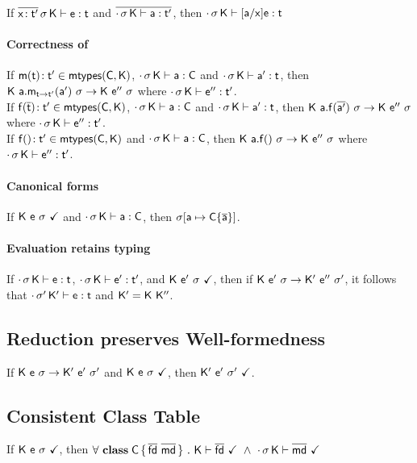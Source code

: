 \documentclass[acmlarge, anonymous, authordraft]{acmart}
\begin{document}
If $\EnvType{\b{\HT\x\tp}}\s\K\e\t$ and $\b{\EnvType\cdot\s\K\a\tp}$, then $\EnvType\cdot\s\K{[\a/\x]\e}\t$

\paragraph{Correctness of \classoff{\C}{\K}}

If $\Mtype\m{\t}\tp \in \classoff{\C}{\K}$, $\EnvType\cdot\s\K\a\C$ and 
$\EnvType\cdot\s\K\ap\t$, then $\Reduce \K{\KCall\a\m{\ap}{\t}{\tp}}\s \K\epp\s$ where $\EnvType\cdot\s\K\epp\tp$. \\
If $\Mtype\f{\b\t}\tp \in \classoff{\C}{\K}$, $\EnvType\cdot\s\K\a\C$ and 
$\EnvType\cdot\s\K\ap\t$, then $\Reduce \K{\Call\a\f{\b\ap}}\s \K\epp\s$ where $\EnvType\cdot\s\K\epp\tp$. \\
If $\Mtype\f{}\tp \in \classoff{\C}{\K}$ and $\EnvType\cdot\s\K\a\C$, 
then $\Reduce \K{\Call\a\f{}}\s \K\epp\s$ where $\EnvType\cdot\s\K\epp\tp$.

\paragraph{Canonical forms}

If $\WFp\K{\e~\s}$ and $\EnvType\cdot\s\K\a\C$, then $\s[\a\mapsto{\obj\C{\b\a}}]$.

\paragraph{Evaluation retains typing} \label{lem:ert}

If $\EnvType\cdot\s\K\e\t$, $\EnvType\cdot\s\K\ep\tp$, and $\WFp\K{\ep~\s}$, then if $\Reduce\K\ep\s\Kp\epp\sp$, it follows that $\EnvType\cdot\sp\Kp\e\t$ and $\Kp = \K~\Kpp$.

\subsection{Reduction preserves Well-formedness}

If $\Reduce \K\e\s \Kp\ep\sp$ and $\WFp\K{\e~\s}$, then $\WFp\Kp{\ep~\sp}$. 

\subsection{Consistent Class Table}

If $\WFp\K{\e~\s}$, then $\forall~\Class\C{\b{\fd}}{\b\md}~.~\WFtype\K{\b\fd}~\wedge~\WF\cdot\s\K{\b\md}$
\end{document}
